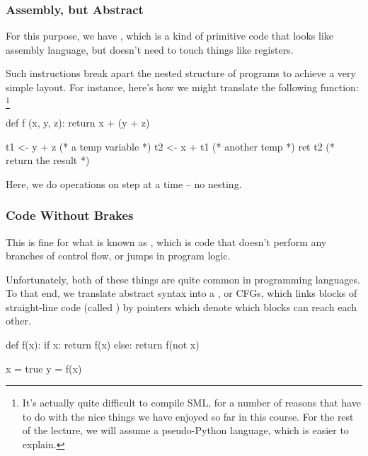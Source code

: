 \documentclass[aspectratio=169, handout]{beamer}
\begin{document}
\begin{frame}[fragile]
  \frametitle{Assembly, but Abstract}

  For this purpose, we have , which is a kind of
  primitive code that looks like assembly language, but doesn't need to
  touch things like registers.

  \pause
  \vspace{\fill}

  Such instructions break apart the nested structure of programs to achieve
  a very simple layout. For instance, here's how we might translate the following function:
  \footnote{It's actually quite difficult to compile SML, for a number of reasons
  that have to do with the nice things we have enjoyed so far in this course. For
  the rest of the lecture, we will assume a pseudo-Python language, which is easier
  to explain.}
  \begin{pythoncodeblock}
    def f (x, y, z):
      return x + (y + z)
  \end{pythoncodeblock}

  \pause
  \vspace{\fill}

  \begin{codeblock}
    t1 <- y + z   (* a temp variable *)
    t2 <- x + t1  (* another temp *)
    ret t2        (* return the result *)
  \end{codeblock}

  \pause
  \vspace{\fill}

  Here, we do operations on step at a time -- no nesting.
\end{frame}

\begin{frame}[fragile]
  \frametitle{Code Without Brakes}

  This is fine for what is known as , which is code
  that doesn't perform any branches of control flow, or jumps in program logic.

  \pause
  \vspace{\fill}

  Unfortunately, both of these things are quite common in programming languages.
  To that end, we translate abstract syntax into a ,
  or CFGs, which links blocks of straight-line code (called )
  by pointers which denote which blocks can reach each other.
  \begin{pythoncodeblock}
    def f(x):
      if x:
        return f(x)
      else:
        return f(not x)

    x = true
    y = f(x)
  \end{pythoncodeblock}
\end{frame}
\end{document}
